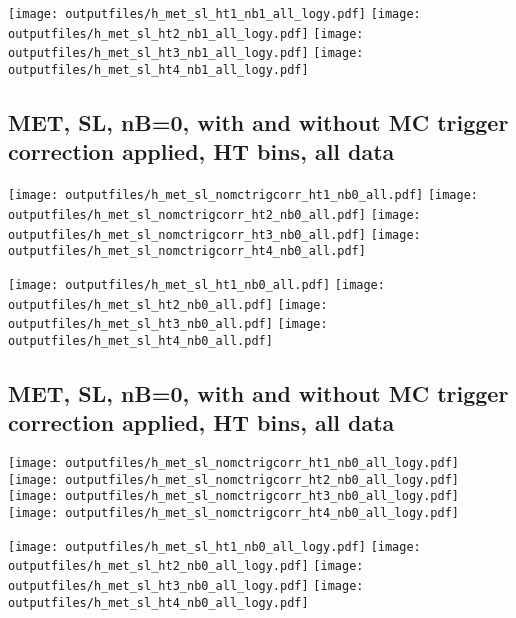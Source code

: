 \documentclass[11pt]{article}
\begin{document}
    \noindent
     \texttt{[image: outputfiles/h\_met\_sl\_ht1\_nb1\_all\_logy.pdf]}
     \texttt{[image: outputfiles/h\_met\_sl\_ht2\_nb1\_all\_logy.pdf]}
     \texttt{[image: outputfiles/h\_met\_sl\_ht3\_nb1\_all\_logy.pdf]}
     \texttt{[image: outputfiles/h\_met\_sl\_ht4\_nb1\_all\_logy.pdf]}


     \clearpage
     \subsection{ MET, SL, nB=0, with and without MC trigger correction applied, HT bins, all data}

    \noindent
     \texttt{[image: outputfiles/h\_met\_sl\_nomctrigcorr\_ht1\_nb0\_all.pdf]}
     \texttt{[image: outputfiles/h\_met\_sl\_nomctrigcorr\_ht2\_nb0\_all.pdf]}
     \texttt{[image: outputfiles/h\_met\_sl\_nomctrigcorr\_ht3\_nb0\_all.pdf]}
     \texttt{[image: outputfiles/h\_met\_sl\_nomctrigcorr\_ht4\_nb0\_all.pdf]}

    \noindent
     \texttt{[image: outputfiles/h\_met\_sl\_ht1\_nb0\_all.pdf]}
     \texttt{[image: outputfiles/h\_met\_sl\_ht2\_nb0\_all.pdf]}
     \texttt{[image: outputfiles/h\_met\_sl\_ht3\_nb0\_all.pdf]}
     \texttt{[image: outputfiles/h\_met\_sl\_ht4\_nb0\_all.pdf]}

    \clearpage
     \subsection{ MET, SL, nB=0, with and without MC trigger correction applied, HT bins, all data}

    \noindent
     \texttt{[image: outputfiles/h\_met\_sl\_nomctrigcorr\_ht1\_nb0\_all\_logy.pdf]}
     \texttt{[image: outputfiles/h\_met\_sl\_nomctrigcorr\_ht2\_nb0\_all\_logy.pdf]}
     \texttt{[image: outputfiles/h\_met\_sl\_nomctrigcorr\_ht3\_nb0\_all\_logy.pdf]}
     \texttt{[image: outputfiles/h\_met\_sl\_nomctrigcorr\_ht4\_nb0\_all\_logy.pdf]}


    \noindent
     \texttt{[image: outputfiles/h\_met\_sl\_ht1\_nb0\_all\_logy.pdf]}
     \texttt{[image: outputfiles/h\_met\_sl\_ht2\_nb0\_all\_logy.pdf]}
     \texttt{[image: outputfiles/h\_met\_sl\_ht3\_nb0\_all\_logy.pdf]}
     \texttt{[image: outputfiles/h\_met\_sl\_ht4\_nb0\_all\_logy.pdf]}
\end{document}
